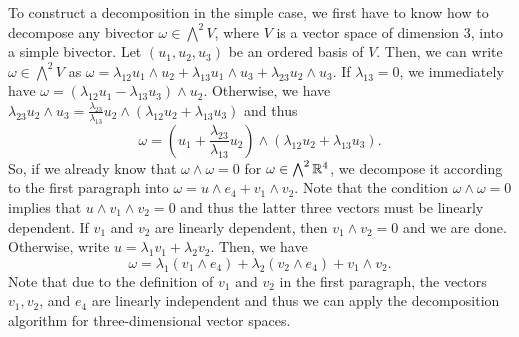 To construct a decomposition in the simple case, we first have to know how to decompose any bivector $\omega \in \bigwedge^2 V$, where $V$ is a vector space of dimension 3, into a simple bivector. Let $(u_1, u_2, u_3)$ be an ordered basis of $V$. Then, we can write $\omega \in \bigwedge^2 V$ as $\omega = \lambda_{12} u_1 \wedge u_2 + \lambda_{13} u_1 \wedge u_3 + \lambda_{23} u_2 \wedge u_3$. If $\lambda_{13} = 0$, we immediately have $\omega = (\lambda_{12} u_1 - \lambda_{13} u_3) \wedge u_2$. Otherwise, we have $\lambda_{23} u_2 \wedge u_3 = \frac{\lambda_{23}}{\lambda_{13}} u_2 \wedge (\lambda_{12} u_2 + \lambda_{13} u_3)$ and thus
\begin{equation}
    \omega =\left (u_1 + \frac{\lambda_{23}}{\lambda_{13}} u_2 \right) \wedge \left(\lambda_{12} u_2 + \lambda_{13} u_3 \right).
\end{equation}
So, if we already know that $\omega \wedge \omega = 0$ for $\omega \in \bigwedge^2 \mathbb{R}^4$, we decompose it according to the first paragraph into $\omega = u \wedge e_4 + v_1 \wedge v_2$. Note that the condition $\omega \wedge \omega = 0$ implies that $u \wedge v_1 \wedge v_2 = 0$ and thus the latter three vectors must be linearly dependent. If $v_1$ and $v_2$ are linearly dependent, then $v_1 \wedge v_2 = 0$ and we are done. Otherwise, write $u = \lambda_1 v_1 + \lambda_2 v_2$. Then, we have
\begin{equation}
    \omega = \lambda_1 (v_1 \wedge e_4) + \lambda_2(v_2 \wedge e_4) + v_1 \wedge v_2.
\end{equation}
Note that due to the definition of $v_1$ and $v_2$ in the first paragraph, the vectors $v_1, v_2$, and $e_4$ are linearly independent and thus we can apply the decomposition algorithm for three-dimensional vector spaces.